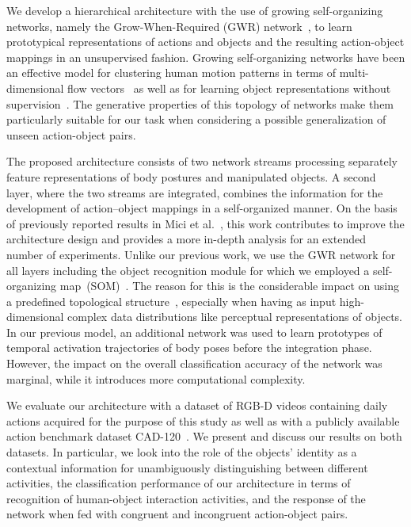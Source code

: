 \documentclass[5p,times]{elsarticle}
\begin{document}
We develop a hierarchical architecture with the use of growing self-organizing networks, namely the Grow-When-Required (GWR) network~\citep{marsland2002self}, to learn prototypical representations of actions and objects and the resulting action-object mappings in an unsupervised fashion.
Growing self-organizing networks have been an effective model for clustering human motion patterns in terms of multi-dimensional flow vectors~\cite{parisiFrontiers, parisi2014human} as well as for learning object representations without supervision~\citep{donatti2010evolutionary}.
The generative properties of this topology of networks make them particularly suitable for our task when considering a possible generalization of unseen action-object pairs.

The proposed architecture consists of two network streams processing separately feature representations of body postures and manipulated objects.
A second layer, where the two streams are integrated, combines the information for the development of action--object mappings in a self-organized manner.
On the basis of previously reported results in Mici et al.~\citep{Mici2016}, this work contributes to improve the architecture design and provides a more in-depth analysis for an extended number of experiments.
Unlike our previous work, we use the GWR network for all layers including the object recognition module for which we employed a self-organizing map~(SOM)~\citep{Kohonen201352}.
The reason for this is the considerable impact on using a predefined topological structure~\citep{fritzke1993kohonen}, especially when having as input high-dimensional complex data distributions like perceptual representations of objects.
In our previous model, an additional network was used to learn prototypes of temporal activation trajectories of body poses before the integration phase.
However, the impact on the overall classification accuracy of the network was marginal, while it introduces more computational complexity.

We evaluate our architecture with a dataset of RGB-D videos containing daily actions acquired for the purpose of this study as well as with a publicly available action benchmark dataset CAD-120~\citep{koppula2013learning}.
We present and discuss our results on both datasets.
In particular, we look into  the role of the objects' identity as a contextual information for unambiguously distinguishing between different activities, the classification performance of our architecture in terms of recognition of human-object interaction activities, and the response of the network when fed with congruent and incongruent action-object pairs.
 
\end{document}
